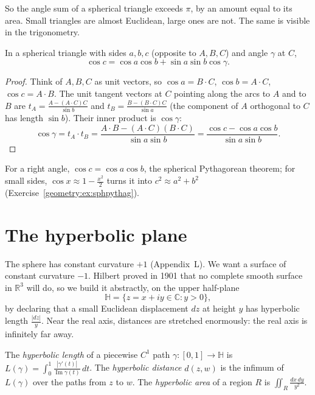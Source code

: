 So the angle sum of a spherical triangle exceeds $\pi$, by an amount equal to its area. Small triangles are almost Euclidean, large ones are not. The same
is visible in the trigonometry.

\begin{proposition}\label{geometry:prop:sphcos}
In a spherical triangle with sides $a,b,c$ (opposite to $A,B,C$) and angle $\gamma$ at $C$,
\[
\cos c=\cos a\cos b+\sin a\sin b\cos\gamma.
\]
\end{proposition}

\begin{proof}
Think of $A,B,C$ as unit vectors, so $\cos a=B\cdot C$, $\cos b=A\cdot C$, $\cos c=A\cdot B$. The unit tangent vectors at $C$ pointing along the arcs to $A$
and to $B$ are $t_A=\frac{A-(A\cdot C)C}{\sin b}$ and $t_B=\frac{B-(B\cdot C)C}{\sin a}$ (the component of $A$ orthogonal to $C$ has length $\sin b$). Their
inner product is $\cos\gamma$:
\[
\cos\gamma=t_A\cdot t_B=\frac{A\cdot B-(A\cdot C)(B\cdot C)}{\sin a\sin b}=\frac{\cos c-\cos a\cos b}{\sin a\sin b}.
\]
\end{proof}

For a right angle, $\cos c=\cos a\cos b$, the spherical Pythagorean theorem; for small sides, $\cos x\approx1-\frac{x^2}2$ turns it into $c^2\approx a^2+b^2$
(Exercise~\ref{geometry:ex:sphpythag}).

\section{The hyperbolic plane}

The sphere has constant curvature $+1$ (Appendix~L). We want a surface of constant curvature $-1$. Hilbert proved in 1901 that no complete smooth surface
in $\mathbb R^3$ will do, so we build it abstractly, on the upper half-plane
\[
\mathbb H=\{z=x+iy\in\mathbb C:y>0\},
\]
by declaring that a small Euclidean displacement $dz$ at height $y$ has hyperbolic length $\frac{|dz|}y$. Near the real axis, distances are stretched
enormously: the real axis is infinitely far away.

\begin{definition}
The \emph{hyperbolic length} of a piecewise $C^1$ path $\gamma:[0,1]\to\mathbb H$ is $L(\gamma)=\int_0^1\frac{|\gamma'(t)|}{\operatorname{Im}\gamma(t)}\,dt$.
The \emph{hyperbolic distance} $d(z,w)$ is the infimum of $L(\gamma)$ over the paths from $z$ to $w$. The \emph{hyperbolic area} of a region $R$ is
$\iint_R\frac{dx\,dy}{y^2}$.
\end{definition}

